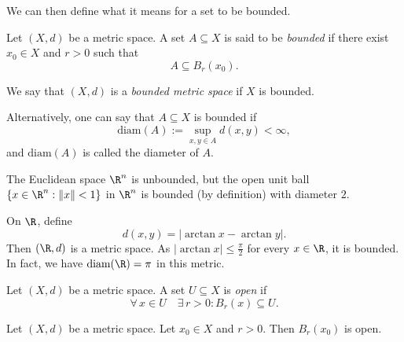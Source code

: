 We can then define what it means for a set to be bounded.



\begin{definition}
Let $(X,d)$ be a metric space. A set $A\subseteq X$ is said to be \emph{bounded} if there exist $x_0\in X$ and $r>0$ such that 
$$
A\subseteq B_r(x_0).
$$ 

We say that $(X,d)$ is a \emph{bounded metric space} if $X$ is bounded.
\end{definition}


\begin{remark}
Alternatively, one can say that $A\subseteq X$ is bounded if
\[
\textrm{diam} (A) := \sup_{x ,y \in A} d(x,y) <\infty,
\]
and $\textrm{diam} (A)$ is called the diameter of $A$.

\end{remark}

\np

\begin{example}
The Euclidean space $\R^n$ is unbounded, but the open unit ball
$\{x \in \R^n: \|x\| < 1\}$
in $\R^n$ is bounded (by definition) with diameter $2$.
\end{example}

\bis

\begin{example}
On $\R$, define
\[
d(x,y) = \left|\arctan x - \arctan y\right|.
\]%
Then $(\R,d)$ is a metric space. As $|\arctan x| \le \frac{\pi}{2}$ for every
$x \in \R$, it is bounded. In fact, we have $\textrm{diam} (\R) = \pi$ in this metric.
\end{example}

\np



\begin{definition}
Let $(X,d)$ be a metric space. A set $U \subseteq X$ is \emph{open} if
\[
\forall \, x \in U \quad \exists \, r > 0 : B_r(x) \subseteq U.
\]
\end{definition}

\bis

\begin{lemma} \label{lemma:balls}
Let $(X,d)$ be a metric space. Let $x_0 \in X$ and $r > 0$. Then $B_r(x_0)$ is open.
\end{lemma}

